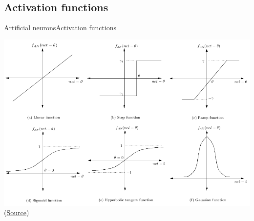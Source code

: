 \documentclass[10pt,compress]{beamer} %
\begin{document}
\subsection{Activation functions}
\begin{frame}{Artificial neurons}{Activation functions}
\begin{center}
	\includegraphics[width=0.8\linewidth]{figs/funciones.png}\\
	\scriptsize{(\href{http://www.turingfinance.com/misconceptions-about-neural-networks/}{Source})}
\end{center}
\end{frame}
\end{document}
